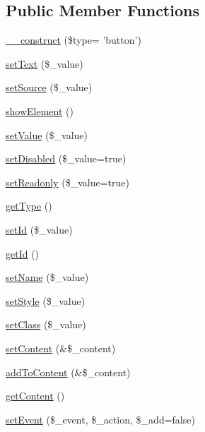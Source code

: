 \subsection*{Public Member Functions}
\begin{DoxyCompactItemize}
\item 
\hyperlink{classFormFieldButtonPlugin_ac8e12626586b106c41c01c605034466e}{\_\-\_\-construct} (\$type= 'button')
\item 
\hyperlink{classFormFieldButtonPlugin_a7bceaf9096561137fb9056a815475025}{setText} (\$\_\-value)
\item 
\hyperlink{classFormFieldButtonPlugin_a2a8cf6a346965f8d264edd7cc293df7b}{setSource} (\$\_\-value)
\item 
\hyperlink{classFormFieldButtonPlugin_a029b1662ddc1652b2a571cb2b72421b7}{showElement} ()
\item 
\hyperlink{classFormFieldPlugin_af951a690345b35e616d204cf51e8899e}{setValue} (\$\_\-value)
\item 
\hyperlink{classFormFieldPlugin_a91fae1af7cc850ae97f3f79652824b8c}{setDisabled} (\$\_\-value=true)
\item 
\hyperlink{classFormFieldPlugin_a866f1fd589c30d9e5bd1e059e4b85905}{setReadonly} (\$\_\-value=true)
\item 
\hyperlink{classFormFieldPlugin_af55e88f21054dfc3a0092c10ef0fbe40}{getType} ()
\item 
\hyperlink{classBaseElement_a0c1ce3d1684ecb78960cf7a97278494e}{setId} (\$\_\-value)
\item 
\hyperlink{classBaseElement_a4a7aa583ee21af392908d7fd42fde790}{getId} ()
\item 
\hyperlink{classBaseElement_a39bafb3609d10048920c20242c2a04c5}{setName} (\$\_\-value)
\item 
\hyperlink{classBaseElement_a6b2b9ff69f6e92db82f91d9c55cda697}{setStyle} (\$\_\-value)
\item 
\hyperlink{classBaseElement_af6597b30fa9798878f6290271043dfa2}{setClass} (\$\_\-value)
\item 
\hyperlink{classBaseElement_a164a9c6e4ee68afa0ad343942ba54d28}{setContent} (\&\$\_\-content)
\item 
\hyperlink{classBaseElement_abd48eef64ca4f419f26d66a0c0419908}{addToContent} (\&\$\_\-content)
\item 
\hyperlink{classBaseElement_af8c86b93bcdcfbc415bf96c622dc5516}{getContent} ()
\item 
\hyperlink{classBaseElement_ad5789f45f16aaa144716ee8558069c31}{setEvent} (\$\_\-event, \$\_\-action, \$\_\-add=false)

\end{DoxyCompactItemize}
